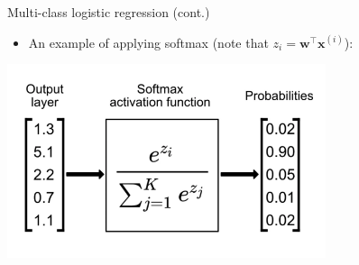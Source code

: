 \documentclass[serif, aspectratio=169]{beamer}
\begin{document}
\begin{frame}{Multi-class logistic regression (cont.)}
    \begin{itemize}
        \item An example of applying softmax (note that $z_i=\mathbf{w}^\top \mathbf{x}^{(i)}$):
    \end{itemize}
    \begin{center}
        \includegraphics[width=0.7\textwidth]{pic/softmax0.png}
       
    \end{center}
\end{frame}
\end{document}
